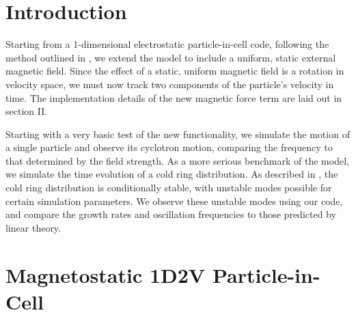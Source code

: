 \documentclass[%
 reprint,
 amsmath,amssymb,
 aps,
]{revtex4-2}
\begin{document}
\maketitle



\section{Introduction}

Starting from a 1-dimensional electrostatic particle-in-cell code, following the method outlined in \cite{BirdsallCharlesK1991Ppvc}, we extend the model to include a uniform, static external magnetic field. Since the effect of a static, uniform magnetic field is a rotation in velocity space, we must now track two components of the particle's velocity in time. The implementation details of the new magnetic force term are laid out in section II.

Starting with a very basic test of the new functionality, we simulate the motion of a single particle and observe its cyclotron motion, comparing the frequency to that determined by the field strength. As a more serious benchmark of the model, we simulate the time evolution of a cold ring distribution. As described in \cite{PhysRevLett.14.131}, the cold ring distribution is conditionally stable, with unstable modes possible for certain simulation parameters. We observe these unstable modes using our code, and compare the growth rates and oscillation frequencies to those predicted by linear theory.

\section{Magnetostatic 1D2V Particle-in-Cell}
\end{document}
